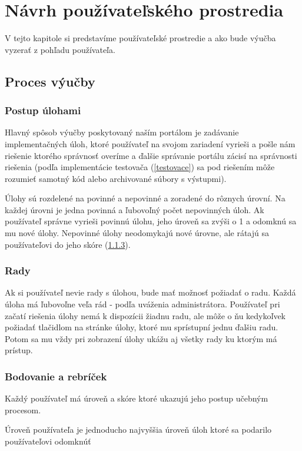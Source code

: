\chapter{Návrh používateľského prostredia}

\label{kap:front}

V tejto kapitole si predstavíme používateľské prostredie a ako bude výučba vyzerať
z pohľadu používateľa.

\section{Proces výučby}
\subsection{Postup úlohami}
Hlavný spôsob výučby poskytovaný naším portálom je zadávanie implementačných úloh,
ktoré používateľ na svojom zariadení vyrieši a pošle nám riešenie ktorého správnosť
overíme a ďalšie správanie portálu zácisí na správnosti riešenia
(podľa implementácie testovača (\ref{testovace}) sa pod riešením môže rozumieť
samotný kód alebo archivované súbory s výstupmi).

Úlohy sú rozdelené na povinné a nepovinné a zoradené do rôznych úrovní.
Na každej úrovni je jedna povinná a ľubovoľný počet nepovinných úloh.
Ak používateľ správne vyrieši povinnú úlohu, jeho úroveň sa zvýši o 1 a
odomknú sa mu nové úlohy. Nepovinné úlohy neodomykajú nové úrovne, ale rátajú
sa používateľovi do jeho skóre (\ref{score}).

\subsection{Rady}
Ak si používateľ nevie rady s úlohou, bude mať možnosť požiadať o radu. Každá úloha
má ľubovoľne veľa rád - podľa uváženia administrátora. Používateľ pri začatí riešenia
úlohy nemá k dispozícii žiadnu radu, ale môže o ňu kedykoľvek požiadať tlačidlom na
stránke úlohy, ktoré mu sprístupní jednu ďalšiu radu.
Potom sa mu vždy pri zobrazení úlohy ukážu aj všetky rady ku ktorým má prístup.

\newpage
\subsection{Bodovanie a rebríček}
\label{score}
Každý používateľ má úroveň a skóre ktoré ukazujú jeho postup učebným procesom.

Úroveň používateľa je jednoducho najvyššia úroveň úloh ktoré sa podarilo používateľovi odomknúť

